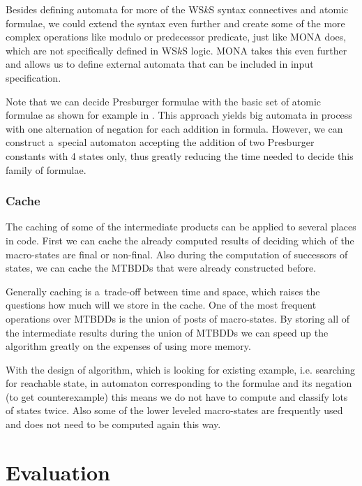  Besides defining automata for more of the WS$k$S syntax connectives and atomic
 formulae, we could extend the syntax even further and create some of the more
 complex operations like modulo or predecessor predicate, just like
 \textsc{MONA} does, which are not specifically defined in WS$k$S logic.
 \textsc{MONA} \cite{mona-secrets} takes this even further and allows us to
 define external automata that can be included in input specification.
 
 Note that we can decide Presburger formulae \cite{presburger} with the basic
 set of atomic formulae as shown for example in \cite{nfa}. This
 approach yields big automata in process with one alternation of negation for
 each addition in formula. However, we can construct a~special automaton
 accepting the addition of two Presburger constants with 4 states only, thus
 greatly reducing the time needed to decide this family of formulae.
 
 \subsection{Cache}
 
 The caching of some of the intermediate products can be applied to several
 places in code. First we can cache the already computed results of deciding
 which of the macro-states are final or non-final. Also during the computation
 of successors of states, we can cache the MTBDDs that were already constructed
 before.
 
 Generally caching is a~trade-off between time and space, which raises the
 questions how much will we store in the cache. One of the most frequent
 operations over MTBDDs is the union of posts of macro-states. By storing all of
 the intermediate results during the union of MTBDDs we can speed up the
 algorithm greatly on the expenses of using more memory.
  
 With the design of algorithm, which is looking for existing example, i.e.
 searching for reachable state, in automaton corresponding to the formulae and
 its negation (to get counterexample) this means we do not have to compute
 and classify lots of states twice. Also some of the lower leveled macro-states
 are frequently used and does not need to be computed again this way.

\chapter{Evaluation}\label{evalChapter}


